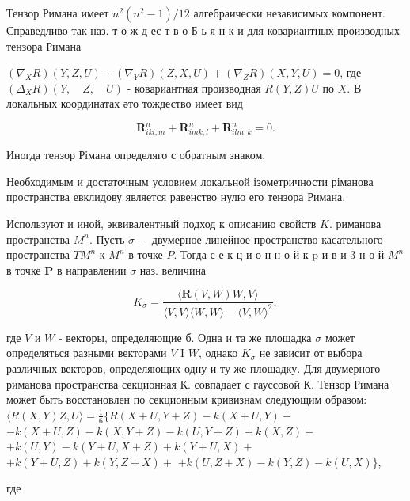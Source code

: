\documentclass[10pt]{article}
\begin{document}
Тензор Римана имеет $n^{2}\left(n^{2}-1\right) / 12$ алгебраически независимых компонент. Справедливо так наз. т о ж д ес т в о Б ь я н к и для ковариантных производных тензора Римана



$\left(\nabla_{X} R\right)(Y, Z, U)+\left(\nabla_{Y} R\right)(Z, X, U)+\left(\nabla_{Z} R\right)(X, Y, U)=0$, где $\left(\Delta_{X} R\right)(Y, \quad Z, \quad U)$ - ковариантная производная $R(Y, Z) U$ по $X$. В локальных координатах әто тождество имеет вид



\[

\boldsymbol{R}_{i k l ; m}^{n}+\boldsymbol{R}_{i m k ; l}^{n}+\boldsymbol{R}_{i l m ; k}^{n}=0 .

\]



Иногда тензор Рімана определяго с обратным знаком.



Необходимым и достаточным условием локальной ізометричности ріманова пространства евклидову является равенство нулю его тензора Римана.



Используют и иной, эквивалентный подход к описанию свойств $K$. риманова пространства $M^{n}$. Пусть $\sigma-$ двумерное линейное пространство касательного пространства $T M^{n}$ к $M^{n}$ в точке $P$. Тогда с е к ц и о н н о й к $\mathrm{p}$ и в и 3 н о й $M^{n}$ в точке $\boldsymbol{P}$ в направлении $\sigma$ наз. величина



\[

K_{\sigma}=\frac{\langle\boldsymbol{R}(V, W) W, V\rangle}{\langle V, V\rangle\langle W, W\rangle-\langle V, W\rangle^{2}},

\]



где $V$ и $W$ - векторы, определяющие б. Одна и та же площадка $\sigma$ может определяться разными векторами $V$ I $W$, однако $K_{\sigma}$ не зависит от выбора различных векторов, определяющих одну и ту же площадку. Для двумерного риманова пространства секционная К. совпадает с гауссовой К. Тензор Римана может быть восстановлен по секционным кривизнам следующим образом: $\langle R(X, Y) Z, U\rangle=\frac{1}{6}\{R(X+U, Y+Z)-k(X+U, Y)-$ $-k(X+U, Z)-k(X, Y+Z)-k(U, Y+Z)+k(X, Z)+$ $+k(U, Y)-k(Y+U, X+Z)+k(Y+U, X)+$ $+k(Y+U, Z)+k(Y, Z+X)+$ $+k(U, Z+X)-k(Y, Z)-k(U, X)\}$,



где
\end{document}
